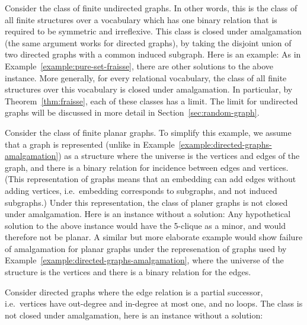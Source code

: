 \begin{myexample} 
	\label{example:directed-graphs-amalgamation}
	Consider the class of finite undirected graphs. In other words, this is the class of all finite structures over a vocabulary which has one binary relation that is required to be symmetric and irreflexive. This class is closed under amalgamation (the same argument works for directed graphs), by taking the disjoint union of two directed graphs with a common induced subgraph. Here is an example:
	As in Example~\ref{example:pure-set-fraisse}, there are other solutions to the above instance. 
		More generally, for every relational vocabulary, the class of all finite structures over this vocabulary is closed under amalgamation. In particular, by Theorem~\ref{thm:fraisse}, each of these classes has a \fraisse limit. The limit for undirected graphs will be discussed in more detail in Section~\ref{sec:random-graph}. 
\end{myexample} 
\begin{myexample}
	\label{example:planar-no-amalgamation}
	 Consider the class of finite planar graphs. To simplify this example, we assume that a graph is represented (unlike in Example~\ref{example:directed-graphs-amalgamation}) as a structure where the universe is the  vertices and edges of the graph, and there is a binary relation for incidence between edges and vertices. (This representation of graphs means that an embedding can add edges without adding vertices, i.e.~embedding corresponds to subgraphs, and not induced subgraphs.) Under this representation, the class of planer graphs is  not closed under amalgamation. Here is an instance without a solution:
	Any hypothetical solution to the above instance would have the 5-clique as a minor, and would therefore not be planar. 
	A similar but more elaborate example would show failure of amalgamation for planar graphs under the represenation of graphs used by Example~\ref{example:directed-graphs-amalgamation}, where the universe of the structure is the vertices and there is a binary relation for the edges. 
 \end{myexample}
		\begin{myexample}\label{example:successor-no-amalgamation} Consider directed graphs
			where the edge relation is a partial successor, i.e.~vertices have out-degree and in-degree at most one, and no loops. The class is not closed under amalgamation, here is an instance without a solution:
		\end{myexample}
		
